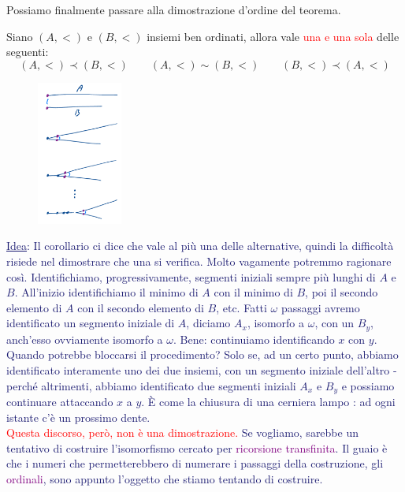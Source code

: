 Possiamo finalmente passare alla dimostrazione d'ordine del teorema.

\begin{theorem}
	Siano $(A,<)$ e $(B,<)$ insiemi ben ordinati, allora vale \textcolor{red}{una e una sola} delle seguenti:
	\[ (A,<) \prec (B,<) \qquad (A,<) \sim (B,<) \qquad (B,<) \prec (A,<)
		\]
\end{theorem}

\begin{figure}
	\includegraphics[width = 2.80cm]{immagini/ordine_totale_buoni_ordini.png}
\end{figure}

\textcolor{MidnightBlue}{\underline{Idea}: Il corollario ci dice che vale al più una delle alternative, quindi la difficoltà risiede nel dimostrare che una si verifica. Molto vagamente potremmo ragionare così.
Identifichiamo, progressivamente, segmenti iniziali sempre più lunghi di $A$ e $B$. All'inizio identifichiamo il minimo di $A$ con il minimo di $B$, poi il secondo elemento di $A$ con il secondo elemento di $B$, etc. Fatti $\omega$
passaggi avremo identificato un segmento iniziale di $A$, diciamo $A_x$, isomorfo a $\omega$, con un $B_y$, anch'esso ovviamente isomorfo a $\omega$. Bene: continuiamo identificando $x$ con $y$. Quando potrebbe bloccarsi il procedimento?
Solo se, ad un certo punto, abbiamo identificato interamente uno dei due insiemi, con un segmento iniziale dell'altro - perché altrimenti, abbiamo identificato due segmenti iniziali $A_x$ e $B_y$ e possiamo continuare attaccando $x$ a $y$. È 
come la chiusura di una cerniera lampo : ad ogni istante c'è un prossimo dente.\\
\textcolor{red}{Questa discorso, però, non è una dimostrazione.} Se vogliamo, sarebbe un tentativo di costruire l'isomorfismo cercato per \textcolor{purple}{ricorsione transfinita}. Il guaio è che i numeri che permetterebbero di numerare i passaggi della costruzione,
gli \textcolor{purple}{ordinali}, sono appunto l'oggetto che stiamo tentando di costruire.}

